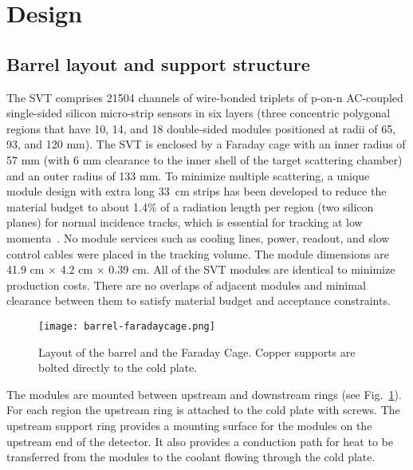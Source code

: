 \section{Design}

\subsection{Barrel layout and support structure}

The SVT comprises 21504 channels of wire-bonded triplets of p-on-n AC-coupled single-sided silicon micro-strip sensors in six layers (three concentric polygonal regions that have 10, 14, and 18 double-sided modules positioned at radii of 65, 93, and 120 mm). The SVT is enclosed by a Faraday cage with an inner radius of 57 mm (with 6 mm clearance to the inner shell of the target scattering chamber) and an outer radius of 133 mm. To minimize multiple scattering, a unique module design with extra long 33~cm strips has been developed to reduce the material budget to about 1.4$\%$ of a radiation length per region (two silicon planes) for normal incidence tracks, which is essential for tracking at low momenta~\cite{Vertex2016}. No module services such as cooling lines, power, readout, and slow control cables were placed in the tracking volume. The module dimensions are 41.9 cm $\times$ 4.2 cm $\times$ 0.39 cm. All of the SVT modules are identical to minimize production costs. There are no overlaps of adjacent modules and minimal clearance between them to satisfy material budget and acceptance constraints.

\begin{figure}[hbt] 
\centering 
\texttt{[image: barrel-faradaycage.png]}
\caption{Layout of the barrel and the Faraday Cage. Copper supports are bolted directly to the cold plate.}
\label{fig:barrel-faradaycage}
\end{figure}



The modules  are mounted between upstream and downstream rings (see Fig.~\ref{fig:barrel-faradaycage}). For each region the upstream ring is attached to the cold plate with screws. The upstream support ring provides a mounting surface for the modules on the upstream end of the detector. It also provides a conduction path for heat to be transferred from the modules to the coolant flowing through the cold plate. 

